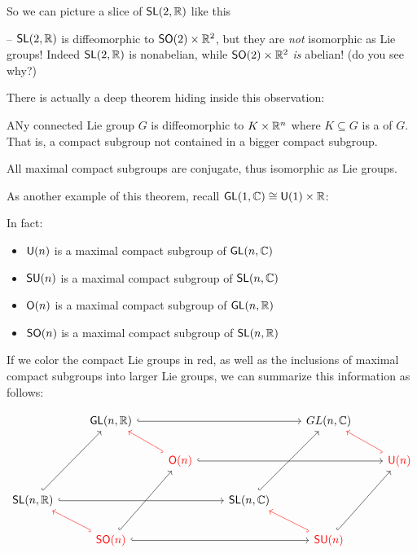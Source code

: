 \documentclass[../main.tex]{subfiles}
\begin{document}
So we can picture a slice of $\mathsf{SL}(2, \mathbb{R})$ like this


\warning -- $\mathsf{SL}(2, \mathbb{R})$ is diffeomorphic to $\mathsf{SO}(2) \times \mathbb{R}^2$,
but they are \emph{not} isomorphic as Lie groups! Indeed $\mathsf{SL}(2, \mathbb{R})$ is
nonabelian, while $\mathsf{SO}(2) \times \mathbb{R}^2$ \emph{is} abelian! (do you see why?)

There is actually a deep theorem hiding inside this observation:

\begin{thm}
  ANy connected Lie group $G$ is diffeomorphic to $K \times \mathbb{R}^n$ where
  $K \subseteq G$ is a  of $G$. That is,
  a compact subgroup not contained in a bigger compact subgroup.

  All maximal compact subgroups are conjugate, thus isomorphic as Lie groups.
\end{thm}

As another example of this theorem, recall $\mathsf{GL}(1,\mathbb{C}) \cong \mathsf{U}(1) \times \mathbb{R}$:


In fact:

\begin{thm}
  \begin{itemize}
    \item $\mathsf{U}(n)$ is a maximal compact subgroup of $\mathsf{GL}(n,\mathbb{C})$   
    \item $\mathsf{SU}(n)$ is a maximal compact subgroup of $\mathsf{SL}(n,\mathbb{C})$
    \item $\mathsf{O}(n)$ is a maximal compact subgroup of $\mathsf{GL}(n,\mathbb{R})$
    \item $\mathsf{SO}(n)$ is a maximal compact subgroup of $\mathsf{SL}(n,\mathbb{R})$
  \end{itemize}
\end{thm}

If we color the compact Lie groups in red, as well as the inclusions
of maximal compact subgroups into larger Lie groups, we can summarize this
information as follows:

\[\begin{tikzcd}
	& {\mathsf{GL}(n,\mathbb{R})} &&& {GL(n,\mathbb{C})} \\
  && {\color{red}{\mathsf{O}(n)}} &&& {\color{red}{\mathsf{U}(n)}} \\
	{\mathsf{SL}(n,\mathbb{R})} &&& {\mathsf{SL}(n,\mathbb{C})} \\
  & {\color{red}{\mathsf{SO}(n)}} &&& {\color{red}{\mathsf{SU}(n)}}
	\arrow[hook, from=4-2, to=3-1, color=red]
	\arrow[hook, from=3-1, to=1-2]
	\arrow[hook, from=4-2, to=2-3]
	\arrow[hook, from=2-3, to=1-2, color=red]
	\arrow[hook, from=4-5, to=2-6]
	\arrow[hook, from=4-5, to=3-4, color=red]
	\arrow[hook, from=3-4, to=1-5]
	\arrow[hook, from=2-6, to=1-5, color=red]
	\arrow[hook, from=1-2, to=1-5]
	\arrow[hook, from=3-1, to=3-4]
	\arrow[hook, from=4-2, to=4-5]
	\arrow[hook, from=2-3, to=2-6]
\end{tikzcd}\]
\end{document}
